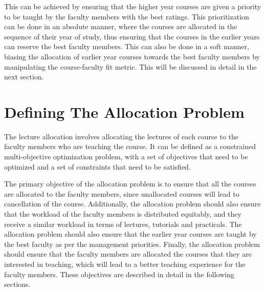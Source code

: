 This can be achieved by ensuring that the higher year courses are given a priority to be taught by the faculty members with the best ratings. This prioritization can be done in an absolute manner, where the courses are allocated in the sequence of their year of study, thus ensuring that the courses in the earlier years can reserve the best faculty members. This can also be done in a soft manner, biasing the allocation of earlier year courses towards the best faculty members by manipulating the course-faculty fit metric. This will be discussed in detail in the next section.

\section{Defining The Allocation Problem}

The lecture allocation involves allocating the lectures of each course to the faculty members who are teaching the course. It can be defined as a constrained multi-objective optimization problem, with a set of objectives that need to be optimized and a set of constraints that need to be satisfied.

The primary objective of the allocation problem is to ensure that all the courses are allocated to the faculty members, since unallocated courses will lead to cancellation of the course. Additionally, the allocation problem should also ensure that the workload of the faculty members is distributed equitably, and they receive a similar workload in terms of lectures, tutorials and practicals. The allocation problem should also ensure that the earlier year courses are taught by the best faculty as per the management priorities. Finally, the allocation problem should ensure that the faculty members are allocated the courses that they are interested in teaching, which will lead to a better teaching experience for the faculty members. These objectives are described in detail in the following sections.

